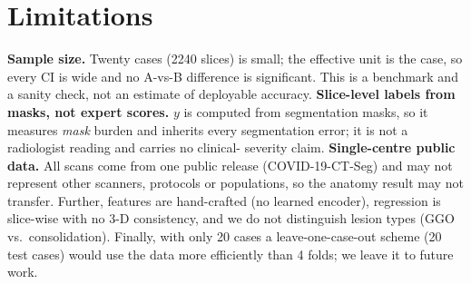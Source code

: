 \documentclass[conference]{IEEEtran}
\begin{document}
\section{Limitations}
\textbf{Sample size.} Twenty cases (2240 slices) is small; the effective unit is
the case, so every CI is wide and no A-vs-B difference is significant. This is a
benchmark and a sanity check, not an estimate of deployable accuracy.
\textbf{Slice-level labels from masks, not expert scores.} $y$ is computed from
segmentation masks, so it measures \emph{mask} burden and inherits every
segmentation error; it is not a radiologist reading and carries no clinical-
severity claim. \textbf{Single-centre public data.} All scans come from one
public release (COVID-19-CT-Seg) and may not represent other scanners, protocols
or populations, so the anatomy result may not transfer. Further, features are
hand-crafted (no learned encoder), regression is slice-wise with no 3-D
consistency, and we do not distinguish lesion types (GGO vs.\ consolidation).
Finally, with only 20 cases a leave-one-case-out scheme (20 test cases) would
use the data more efficiently than 4 folds; we leave it to future work.



\end{document}
